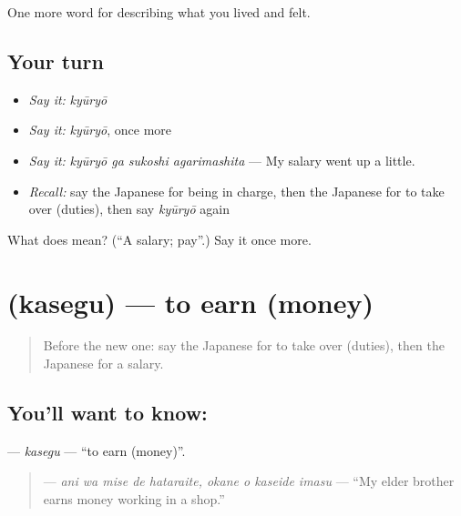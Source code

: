\begin{grammarlens}[title={What you've built}]
One more word for describing what you lived and felt.
\end{grammarlens}

\subsection*{Your turn}
\begin{itemize}
\raggedright
  \item \emph{Say it:} \emph{kyūryō}
  \item \emph{Say it:} \emph{kyūryō}, once more
  \item \emph{Say it:} \emph{kyūryō ga sukoshi agarimashita} — My salary went up a little.
  \item \emph{Recall:} say the Japanese for being in charge, then the Japanese for to take over (duties), then say \emph{kyūryō} again
\end{itemize}

\begin{tcolorbox}[breakable,colback=teal!4,colframe=teal!35!black,title={Before you move on}]
What does  mean? (\textquotedblleft{}A salary; pay\textquotedblright{}.) Say it once more.
\end{tcolorbox}
\section[\texorpdfstring{\ja{かせぐ} (kasegu)}{かせぐ (kasegu)}]{ (kasegu) — to earn (money)}

\label{lesson:JA-C456-kasegu}



\begin{quote}
Before the new one: say the Japanese for to take over (duties), then the Japanese for a salary.
\end{quote}

\subsection*{You'll want to know: }
\textbf{} — \emph{kasegu} — \textquotedblleft{}to earn (money)\textquotedblright{}.

\begin{quote}
\textbf{   } — \emph{ani wa mise de hataraite, okane o kaseide imasu} — \textquotedblleft{}My elder brother earns money working in a shop.\textquotedblright{}
\end{quote}

